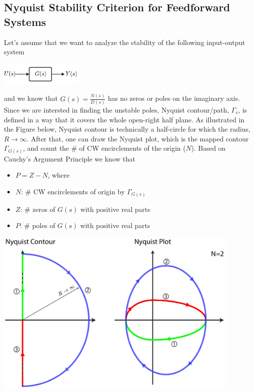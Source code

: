 \documentclass[twoside]{article}
\begin{document}
\subsection{Nyquist Stability Criterion for Feedforward Systems}

Let's assume that we want to analyze the stability of the following
input-output system

\vspace{6 pt}

  \begin{minipage}[h]{1\linewidth}
    \begin{center}
      \includegraphics[width=0.3\textwidth]{sys}
    \end{center}
  \end{minipage}

\vspace{6 pt}

and we know that $G(s) = \frac{N(s)}{D(s)}$ has no zeros or poles on
the imaginary axis. Since we are intersted in finding the unstable
poles, Nyquist contour/path, $\Gamma_s$, is defined in a way that it covers the
whole open-right half plane. As illustrated in the Figure below, 
Nyquist contour is technically a half-circle for which the radius, $R
\to \infty$. After that, one can draw the Nyquist plot, which is the
mapped contour $\Gamma_{G(s)}$, and count the $\#$ of CW encirclements 
of the origin ($N$). Based on Cauchy's Argument Principle we know that
%
\begin{itemize}
  \item $P = Z - N$, where
  \item $N$: $\#$ CW encirclements of origin by $\Gamma_{G(s)}$
  \item $Z$: $\#$ zeros of $G(s)$ with positive real parts
  \item $P$: $\#$ poles of $G(s)$ with positive real parts
\end{itemize}

\vspace{6 pt}

  \begin{minipage}[h]{1\linewidth}
    \begin{center}
      \includegraphics[width=0.9\textwidth]{nyq}
    \end{center}
  \end{minipage}
\end{document}
